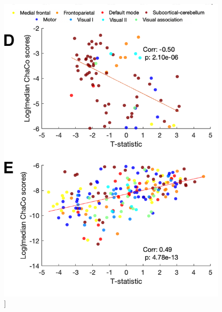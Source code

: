 \documentclass[phd,tocprelim]{cornell}
\renewcommand{\caption}[1]{\singlespacing\hangcaption{#1}\normalspacing}
\begin{document}
\null
\vfill
\clearpage
\null
\vfill
\begin{figure}[h!]
		\ContinuedFloat
		\captionsetup{labelformat=adja-page}
    \centering
    \includegraphics[width=\textwidth]{chapter1/Figure4DE.png}
    \caption[]{}
\end{figure}


    
    
\end{document}
